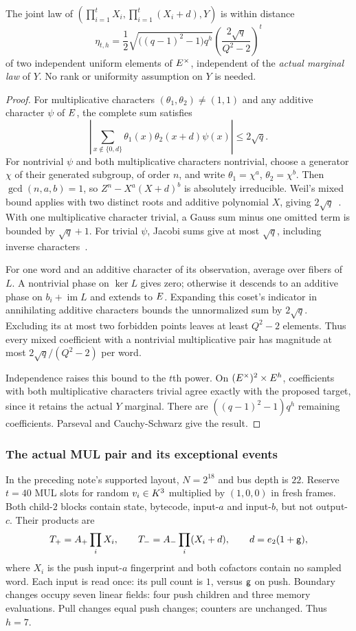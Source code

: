 \begin{lemma}
The joint law of $(\prod_{i=1}^tX_i,\prod_{i=1}^t(X_i+d),Y)$ is within distance
\[
 \eta_{t,h}=\frac12\sqrt{\bigl((q-1)^2-1\bigr)q^h}
 \left(\frac{2\sqrt q}{Q^2-2}\right)^t
\]
of two independent uniform elements of $E^\times$, independent of the \emph{actual marginal law} of $Y$. No rank or uniformity assumption on $Y$ is needed.
\end{lemma}
\begin{proof}
For multiplicative characters $(\theta_1,\theta_2)\ne(1,1)$ and any additive character $\psi$ of $E$, the complete sum satisfies
\[
 \left|\sum_{x\notin\{0,d\}}\theta_1(x)\theta_2(x+d)\psi(x)\right|
 \le 2\sqrt q.
\]
For nontrivial $\psi$ and both multiplicative characters nontrivial, choose a generator $\chi$ of their generated subgroup, of order $n$, and write $\theta_1=\chi^a$, $\theta_2=\chi^b$. Then $\gcd(n,a,b)=1$, so $Z^n-X^a(X+d)^b$ is absolutely irreducible. Weil's mixed bound applies with two distinct roots and additive polynomial $X$, giving $2\sqrt q$~\cite{winger}. With one multiplicative character trivial, a Gauss sum minus one omitted term is bounded by $\sqrt q+1$. For trivial $\psi$, Jacobi sums give at most $\sqrt q$, including inverse characters~\cite{conrad}.

For one word and an additive character of its observation, average over fibers of $L$. A nontrivial phase on $\ker L$ gives zero; otherwise it descends to an additive phase on $b_i+\operatorname{im}L$ and extends to $E$. Expanding this coset's indicator in annihilating additive characters bounds the unnormalized sum by $2\sqrt q$. Excluding its at most two forbidden points leaves at least $Q^2-2$ elements. Thus every mixed coefficient with a nontrivial multiplicative pair has magnitude at most $2\sqrt q/(Q^2-2)$ per word.

Independence raises this bound to the $t$th power. On $(E^\times)^2\times E^h$, coefficients with both multiplicative characters trivial agree exactly with the proposed target, since it retains the actual $Y$ marginal. There are $((q-1)^2-1)q^h$ remaining coefficients. Parseval and Cauchy-Schwarz give the result.
\end{proof}

\subsubsection{The actual MUL pair and its exceptional events}

In the preceding note's supported layout, $N=2^{18}$ and bus depth is $22$. Reserve $t=40$ MUL slots for random $v_i\in K^3$ multiplied by $(1,0,0)$ in fresh frames. Both child-$2$ blocks contain state, bytecode, input-$a$ and input-$b$, but not output-$c$. Their products are
\[
 T_+=A_+\prod_i X_i,\qquad T_-=A_-\prod_i(X_i+d),
 \qquad d=e_2(1+\mathsf{g}),
\]
where $X_i$ is the push input-$a$ fingerprint and both cofactors contain no sampled word. Each input is read once: its pull count is $1$, versus $\mathsf{g}$ on push. Boundary changes occupy seven linear fields: four push children and three memory evaluations. Pull changes equal push changes; counters are unchanged. Thus $h=7$.

